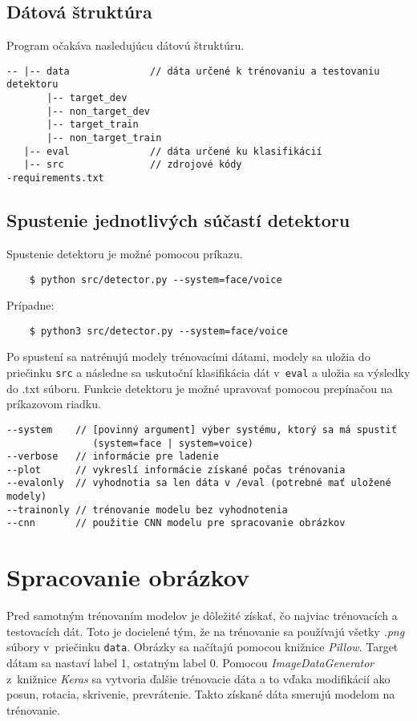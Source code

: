 \documentclass[11pt, a4paper]{article}
\begin{document}
		\subsection{Dátová štruktúra}
	Program očakáva nasledujúcu dátovú štruktúru.
			\begin{verbatim}
-- |-- data              // dáta určené k trénovaniu a testovaniu detektoru
       |-- target_dev
       |-- non_target_dev
       |-- target_train
       |-- non_target_train
   |-- eval              // dáta určené ku klasifikácií
   |-- src               // zdrojové kódy 
-requirements.txt
			\end{verbatim}
			
		\subsection{Spustenie jednotlivých súčastí detektoru}
	Spustenie detektoru je možné pomocou príkazu.
			\begin{verbatim}
    $ python src/detector.py --system=face/voice
			\end{verbatim}
	Prípadne:
			\begin{verbatim}
    $ python3 src/detector.py --system=face/voice
			\end{verbatim}
	Po spustení sa natrénujú modely trénovacími dátami, modely sa uložia do priečinku \texttt{src} a následne sa uskutoční klasifikácia dát v~\texttt{eval} a uložia sa výsledky do .txt súboru.
	Funkcie detektoru je možné upravovať pomocou prepínačou na príkazovom riadku.
			
			\begin{verbatim}
--system    // [povinný argument] výber systému, ktorý sa má spustiť 
               (system=face | system=voice)	
--verbose   // informácie pre ladenie
--plot      // vykreslí informácie získané počas trénovania 
--evalonly  // vyhodnotia sa len dáta v /eval (potrebné mať uložené modely)
--trainonly // trénovanie modelu bez vyhodnotenia
--cnn       // použitie CNN modelu pre spracovanie obrázkov
			\end{verbatim}
			
	\section{Spracovanie obrázkov}
		Pred samotným trénovaním modelov je dôležité získať, čo najviac trénovacích a testovacích dát. Toto je docielené tým, že na trénovanie sa používajú všetky \emph{.png} súbory v~priečinku \texttt{data}. Obrázky sa načítajú pomocou knižnice \emph{Pillow}. Target dátam sa nastaví label 1, ostatným label 0. Pomocou \emph{ImageDataGenerator} z~knižnice \emph{Keras} sa vytvoria ďalšie trénovacie dáta a to vďaka modifikácií ako posun, rotacia, skrivenie, prevrátenie. Takto získané dáta smerujú modelom na trénovanie. 
		
\end{document}
